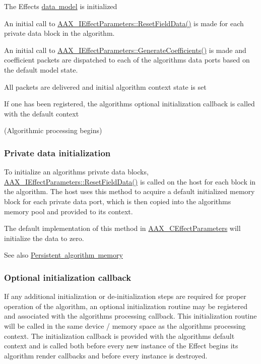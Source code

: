  \begin{DoxyItemize}
\item The Effect\textquotesingle{}s \mbox{\hyperlink{a00798}{data model}} is initialized \item An initial call to \mbox{\hyperlink{a01669_a6e87e40d42c7431e52ae5ebd4f631964}{A\+A\+X\+\_\+\+I\+Effect\+Parameters\+::\+Reset\+Field\+Data()}} is made for each private data block in the algorithm. \item An initial call to \mbox{\hyperlink{a01669_a083265b008921b6114ede387711694b7}{A\+A\+X\+\_\+\+I\+Effect\+Parameters\+::\+Generate\+Coefficients()}} is made and coefficient packets are dispatched to each of the algorithm\textquotesingle{}s data ports based on the default model state. \item All packets are delivered and initial algorithm context state is set \item If one has been registered, the algorithm\textquotesingle{}s optional initialization callback is called with the default context \item (Algorithmic processing begins)\end{DoxyItemize}
\hypertarget{a00797_alg_initialization_private_data}{}\subsubsection{Private data initialization}\label{a00797_alg_initialization_private_data}
 To initialize an algorithm\textquotesingle{}s private data blocks, \mbox{\hyperlink{a01669_a6e87e40d42c7431e52ae5ebd4f631964}{A\+A\+X\+\_\+\+I\+Effect\+Parameters\+::\+Reset\+Field\+Data()}} is called on the host for each block in the algorithm. The host uses this method to acquire a default initialized memory block for each private data port, which is then copied into the algorithm\textquotesingle{}s memory pool and provided to its context.

 The default implementation of this method in \mbox{\hyperlink{a01481_a0dd675680a657de7f9d45d65d4b3bcfb}{A\+A\+X\+\_\+\+C\+Effect\+Parameters}} will initialize the data to zero.

 \begin{DoxySeeAlso}{See also}
\mbox{\hyperlink{a00797_alg_pd}{Persistent algorithm memory}}
\end{DoxySeeAlso}
\hypertarget{a00797_alg_initialization_optional_callback}{}\subsubsection{Optional initialization callback}\label{a00797_alg_initialization_optional_callback}
 If any additional initialization or de-\/initialization steps are required for proper operation of the algorithm, an optional initialization routine may be registered and associated with the algorithm\textquotesingle{}s processing callback. This initialization routine will be called in the same device / memory space as the algorithm\textquotesingle{}s processing context. The initialization callback is provided with the algorithm\textquotesingle{}s default context and is called both before every new instance of the Effect begins its algorithm render callbacks and before every instance is destroyed.

